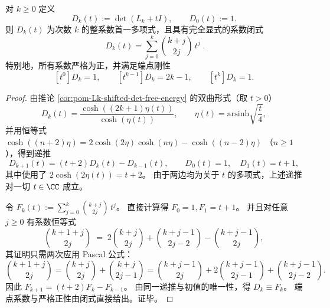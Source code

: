 
\begin{proposition}\label{prop:pom-Lk-det-coeff-binomial}
对 \(k\ge 0\) 定义
\[
D_k(t):=\det(L_k+tI),
\qquad
D_0(t):=1.
\]
则 \(D_k(t)\) 为次数 \(k\) 的整系数首一多项式，且具有完全显式的系数闭式
\[
\boxed{\;
D_k(t)=\sum_{j=0}^{k}\binom{k+j}{2j}\,t^{j}\; }.
\]
特别地，所有系数严格为正，并满足端点刚性
\[
[t^0]D_k=1,\qquad [t^{k-1}]D_k=2k-1,\qquad [t^{k}]D_k=1.
\]
\end{proposition}

\begin{proof}
由推论 \ref{cor:pom-Lk-shifted-det-free-energy} 的双曲形式（取 \(t>0\)）
\[
D_k(t)=\frac{\cosh((2k+1)\eta(t))}{\cosh(\eta(t))},
\qquad
\eta(t)=\mathrm{arsinh}\sqrt{\frac{t}{4}},
\]
并用恒等式
\(
\cosh((n+2)\eta)=2\cosh(2\eta)\cosh(n\eta)-\cosh((n-2)\eta)
\)
（\(n\ge 1\)），得到递推
\[
D_{k+1}(t)=(t+2)D_k(t)-D_{k-1}(t),
\qquad
D_0(t)=1,\quad D_1(t)=t+1,
\]
其中使用了 \(2\cosh(2\eta(t))=t+2\)。
由于两边均为关于 \(t\) 的多项式，上述递推对一切 \(t\in\CC\) 成立。
\par
令
\(
F_k(t):=\sum_{j=0}^{k}\binom{k+j}{2j}\,t^j
\)。
直接计算得 \(F_0=1,F_1=t+1\)。
并且对任意 \(j\ge 0\) 有系数恒等式
\[
\binom{k+1+j}{2j}
\;=\;
2\binom{k+j}{2j}+\binom{k+j-1}{2j-2}-\binom{k+j-1}{2j},
\]
其证明只需两次应用 Pascal 公式：
\[
\binom{k+1+j}{2j}
=\binom{k+j}{2j}+\binom{k+j}{2j-1}
=\binom{k+j-1}{2j}+2\binom{k+j-1}{2j-1}+\binom{k+j-1}{2j-2}.
\]
因此 \(F_{k+1}=(t+2)F_k-F_{k-1}\)。
由同一递推与初值的唯一性，得 \(D_k\equiv F_k\)。
端点系数与严格正性由闭式直接给出。证毕。
\end{proof}

